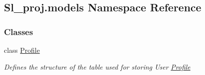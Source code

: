 \hypertarget{namespaceSl__proj_1_1models}{}\subsection{Sl\+\_\+proj.\+models Namespace Reference}
\label{namespaceSl__proj_1_1models}
\subsubsection*{Classes}
\begin{DoxyCompactItemize}
\item 
class \hyperlink{classSl__proj_1_1models_1_1Profile}{Profile}
\begin{DoxyCompactList}\small\item\em Defines the structure of the table used for storing User \hyperlink{classSl__proj_1_1models_1_1Profile}{Profile} \end{DoxyCompactList}\end{DoxyCompactItemize}
